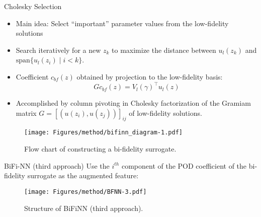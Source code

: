 \documentclass[10pt]{beamer}
\begin{document}
\begin{frame}{Cholesky Selection}
\begin{itemize}
	\item Main idea: Select ``important'' parameter values from the low-fidelity solutions
	\item Search iteratively for a new $z_k $ to maximize the distance between $u_l(z_k)$ and $\text{span}\{u_l(z_i)\mid i < k \}$.
	\item Coefficient $c_{bf}(z) $ obtained by projection to the {\color{red} low-fidelity basis}:
	\begin{equation}
		Gc_{bf}(z) = V_l(\gamma)^\top u_l(z)
	\end{equation}
	\item Accomplished by column pivoting in Cholesky factorization of the Gramiam matrix $G = [(u(z_i), u(z_j))]_{ij} $ of low-fidelity solutions.
\end{itemize}
\begin{figure}
\centering
\texttt{[image: Figures/method/bifinn\_diagram-1.pdf]}
\caption{Flow chart of constructing a bi-fidelity surrogate.}
\label{BiFiNN-structure}
\end{figure}


\end{frame}

\begin{frame}{BiFi-NN (third approach)}
Use the $i^{th} $ component of the POD coefficient of the {\color{red} bi-fidelity surrogate} as the augmented feature:

\begin{figure}
\centering
\texttt{[image: Figures/method/BFNN-3.pdf]}
\caption{Structure of BiFiNN (third approach).}
\label{BiFiNN-structure}
\end{figure}
\end{frame}

\end{document}
